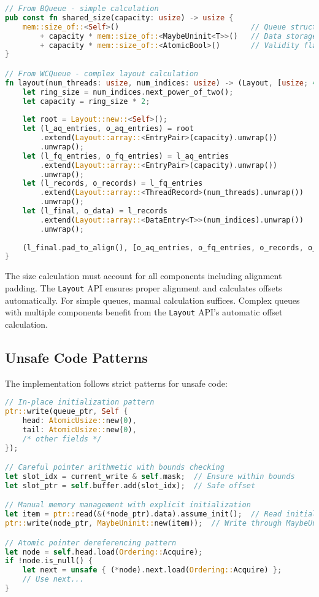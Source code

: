 \begin{lstlisting}[language=Rust, style=boxed, caption={Shared memory size calculation methods}, label={lst:size-calculation}]
// From BQueue - simple calculation
pub const fn shared_size(capacity: usize) -> usize {
    mem::size_of::<Self>()                              // Queue structure
        + capacity * mem::size_of::<MaybeUninit<T>>()   // Data storage
        + capacity * mem::size_of::<AtomicBool>()       // Validity flags
}

// From WCQueue - complex layout calculation
fn layout(num_threads: usize, num_indices: usize) -> (Layout, [usize; 4]) {
    let ring_size = num_indices.next_power_of_two();
    let capacity = ring_size * 2;
    
    let root = Layout::new::<Self>();
    let (l_aq_entries, o_aq_entries) = root
        .extend(Layout::array::<EntryPair>(capacity).unwrap())
        .unwrap();
    let (l_fq_entries, o_fq_entries) = l_aq_entries
        .extend(Layout::array::<EntryPair>(capacity).unwrap())
        .unwrap();
    let (l_records, o_records) = l_fq_entries
        .extend(Layout::array::<ThreadRecord>(num_threads).unwrap())
        .unwrap();
    let (l_final, o_data) = l_records
        .extend(Layout::array::<DataEntry<T>>(num_indices).unwrap())
        .unwrap();
    
    (l_final.pad_to_align(), [o_aq_entries, o_fq_entries, o_records, o_data])
}
\end{lstlisting}

The size calculation must account for all components including alignment padding. The \texttt{Layout} API ensures proper alignment and calculates offsets automatically. For simple queues, manual calculation suffices. Complex queues with multiple components benefit from the \texttt{Layout} API's automatic offset calculation.

\subsection{Unsafe Code Patterns}

The implementation follows strict patterns for unsafe code:

\begin{lstlisting}[language=Rust, style=boxed, caption={Common unsafe code patterns}, label={lst:unsafe-patterns}]
// In-place initialization pattern
ptr::write(queue_ptr, Self { 
    head: AtomicUsize::new(0),
    tail: AtomicUsize::new(0),
    /* other fields */
});

// Careful pointer arithmetic with bounds checking
let slot_idx = current_write & self.mask;  // Ensure within bounds
let slot_ptr = self.buffer.add(slot_idx);  // Safe offset

// Manual memory management with explicit initialization
let item = ptr::read(&(*node_ptr).data).assume_init();  // Read initialized data
ptr::write(node_ptr, MaybeUninit::new(item));  // Write through MaybeUninit

// Atomic pointer dereferencing pattern
let node = self.head.load(Ordering::Acquire);
if !node.is_null() {
    let next = unsafe { (*node).next.load(Ordering::Acquire) };
    // Use next...
}
\end{lstlisting}


